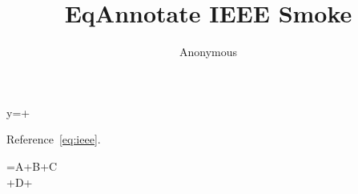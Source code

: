 \documentclass[conference]{IEEEtran}
\begin{document}
\title{EqAnnotate IEEE Smoke}\author{Anonymous}\maketitle
\begin{annotatedequation}[numbered]
y=+\lambda{}\label{eq:ieee}
\end{annotatedequation}
Reference~\ref{eq:ieee}.

\begin{annotatedmultline}
=A+B+C\\
{}+D+
\end{annotatedmultline}
\end{document}
